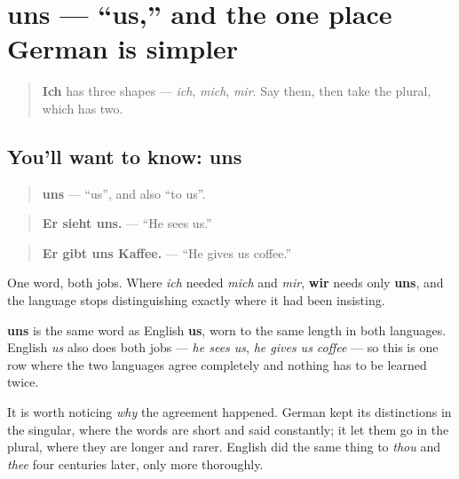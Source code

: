 \section[uns]{uns — \textquotedblleft{}us,\textquotedblright{} and the one place German is simpler}

\label{lesson:GE-C37-uns}



\begin{quote}
\textbf{Ich} has three shapes — \emph{ich}, \emph{mich}, \emph{mir}. Say them, then take the plural, which has two.
\end{quote}

\subsection*{You'll want to know: uns}
\begin{quote}
\textbf{uns} — \textquotedblleft{}us\textquotedblright{}, and also \textquotedblleft{}to us\textquotedblright{}.
\end{quote}

\begin{quote}
\textbf{Er sieht uns.} — \textquotedblleft{}He sees us.\textquotedblright{}
\end{quote}

\begin{quote}
\textbf{Er gibt uns Kaffee.} — \textquotedblleft{}He gives us coffee.\textquotedblright{}
\end{quote}

One word, both jobs. Where \emph{ich} needed \emph{mich} and \emph{mir}, \textbf{wir} needs only \textbf{uns}, and the language stops distinguishing exactly where it had been insisting.

\begin{cousinweb}
\textbf{uns} is the same word as English \textbf{us}, worn to the same length in both languages. English \emph{us} also does both jobs — \emph{he sees us}, \emph{he gives us coffee} — so this is one row where the two languages agree completely and nothing has to be learned twice.

It is worth noticing \emph{why} the agreement happened. German kept its distinctions in the singular, where the words are short and said constantly; it let them go in the plural, where they are longer and rarer. English did the same thing to \emph{thou} and \emph{thee} four centuries later, only more thoroughly.
\end{cousinweb}

